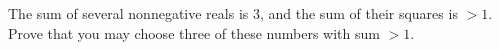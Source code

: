 The sum of several nonnegative reals is $3$, and the sum of their squares is $> 1$. Prove that you may choose three of these numbers with sum $> 1$.
